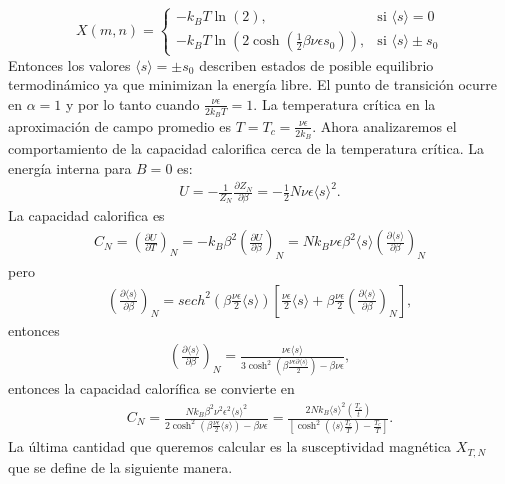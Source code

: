 \documentclass[letterpaper,12pt,oneside]{book}
\begin{document}
%
\[
  X(m, n) = 
  \begin{cases}
    -k_B T \ln(2), & \text{si } \langle s \rangle = 0 \\
    -k_B T\ln(2\cosh(\frac{1}{2}\beta \nu \epsilon s_0)), & \text{si } \langle s \rangle \pm s_0
  \end{cases}
\]
%
Entonces los valores $\langle s \rangle = \pm s_0$ describen estados de posible equilibrio termodin\'amico ya que minimizan la energ\'ia libre. El punto de transici\'on ocurre en $\alpha = 1$ y por lo tanto cuando $\frac{\nu \epsilon}{2k_B   T} = 1$. 
La temperatura cr\'itica en la aproximaci\'on de campo promedio es  $T= T_c = \frac{\nu \epsilon}{2k_B }$.
Ahora analizaremos el comportamiento de la capacidad calorifica cerca de la temperatura cr\'itica. La energ\'ia interna para $B=0$ es:
%
\begin{eqnarray}
U = -\frac{1}{Z_N} \frac{\partial Z_N}{\partial \beta} = -\frac{1}{2} N \nu \epsilon \langle s \rangle^2.
\end{eqnarray}
%
La capacidad calorifica es 
%
\begin{eqnarray}
C_N = \left( \frac{\partial U}{\partial T}\right)_N = - k_B\beta^2 \left(\frac{\partial U}{\partial \beta} \right)_N = N k_B \nu \epsilon \beta^2 \langle s \rangle \left (\frac{\partial \langle s \rangle}{\partial \beta} \right)_N
\end{eqnarray}
%
pero
%
\begin{eqnarray}
\left (\frac{\partial \langle s \rangle}{\partial \beta} \right)_N = sech^2 \left(\beta \frac{\nu \epsilon}{2} \langle s \rangle \right) \left [\frac{\nu \epsilon}{2} \langle s \rangle + \beta \frac{\nu \epsilon}{2} \left( \frac{\partial \langle s \rangle}{\partial \beta}\right)_N \right],
\end{eqnarray}
%
entonces
%
\begin{eqnarray}
\left (\frac{\partial \langle s \rangle}{\partial \beta} \right)_N = \frac{\nu \epsilon \langle s \rangle}{3 \cosh^2 \left(\beta \frac{\nu \epsilon \partial \langle s \rangle}{2} \right)- \beta \nu \epsilon},
\end{eqnarray}
%
entonces la capacidad calor\'ifica se convierte en
%
\begin{eqnarray}
C_N =\frac{N k_B \beta^2 \nu^2 \epsilon^2 \langle s \rangle^2}{2 \cosh^2\left(\beta \frac{\nu \epsilon}{2}\langle s \rangle \right) -\beta \nu \epsilon} = \frac{2Nk_B\langle s \rangle^2(\frac{T_c}{t})}{[\cosh^2 (\langle s \rangle \frac{T_c}{T})-\frac{T_c}{T}]}.
\end{eqnarray}
%
La \'ultima cantidad que queremos calcular es la susceptividad magn\'etica $X_{T,N}$ que se define de la siguiente manera.
\end{document}

